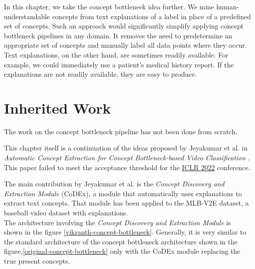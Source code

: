 In this chapter, we take the concept bottleneck idea further.
We mine human-understandable concepts from text explanations of a label in place of a predefined set of concepts.
Such an approach would significantly simplify applying concept bottleneck pipelines in any domain.
It removes the need to predetermine an appropriate set of concepts and manually label all data points where they occur.
Text explanations, on the other hand, are sometimes readily available. For example, we could immediately use a patient's medical history report.
If the explanations are not readily available, they are easy to produce.


\section{Inherited Work}
\label{inherited-work}

The work on the concept bottleneck pipeline has not been done from scratch.

This chapter itself is a continuation of the ideas proposed by Jeyakumar et al. in \emph{Automatic Concept Extraction for Concept Bottleneck-based Video Classification} \cite{RefWorks:RefID:16-2021automatic}. This paper failed to meet the acceptance threshold for the \href{https://iclr.cc/}{ICLR 2022} conference. 

The main contribution by Jeyakumar et al. is the \emph{Concept Discovery and Extraction Module} (CoDEx), a module that automatically uses explanations to extract text concepts.
That module has been applied to the MLB-V2E dataset, a baseball video dataset with explanations. \\
The architecture involving the \emph{Concept Discovery and Extraction Module} is shown in the figure \ref{vikranth-concept-bottleneck}. 
Generally, it is very similar to the standard architecture of the concept bottleneck architecture shown in the figure,\ref{original-concept-bottleneck} only with the CoDEx module replacing the true present concepts.

